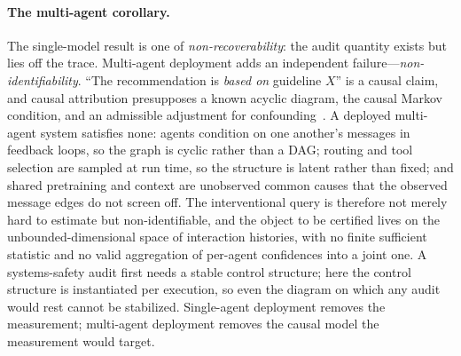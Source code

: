 \paragraph{The multi-agent corollary.} The single-model result is one of \emph{non-recoverability}: the audit quantity exists but lies off the trace. Multi-agent deployment adds an independent failure---\emph{non-identifiability}. ``The recommendation is \emph{based on} guideline $X$'' is a causal claim, and causal attribution presupposes a known acyclic diagram, the causal Markov condition, and an admissible adjustment for confounding~\cite{pearl2009}. A deployed multi-agent system satisfies none: agents condition on one another's messages in feedback loops, so the graph is cyclic rather than a DAG; routing and tool selection are sampled at run time, so the structure is latent rather than fixed; and shared pretraining and context are unobserved common causes that the observed message edges do not screen off. The interventional query is therefore not merely hard to estimate but non-identifiable, and the object to be certified lives on the unbounded-dimensional space of interaction histories, with no finite sufficient statistic and no valid aggregation of per-agent confidences into a joint one. A systems-safety audit first needs a stable control structure; here the control structure is instantiated per execution, so even the diagram on which any audit would rest cannot be stabilized. Single-agent deployment removes the measurement; multi-agent deployment removes the causal model the measurement would target.
